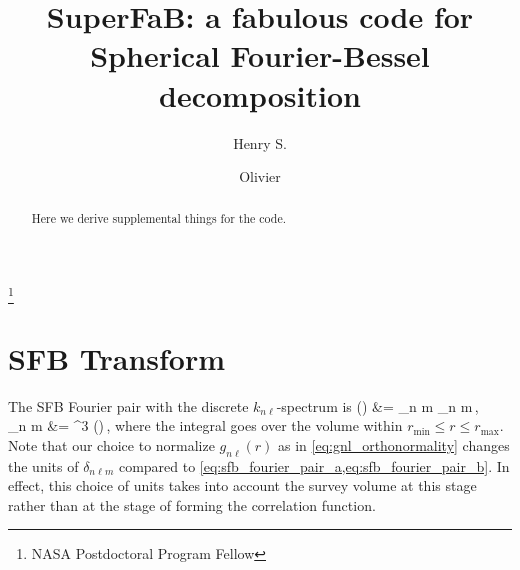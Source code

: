 \documentclass[aps,prd,reprint,floatfix,superscriptaddress,showkeys,nofootinbib]{revtex4-1}
\def\ba#1\ea{\begin{align}#1\end{align}}
\def\vr{{\bm{r}}}
\def\rhat{{\hat{\bm{r}}}}
\def\min{\mathrm{min}}
\def\max{\mathrm{max}}
\def\dd{\mathrm{d}}
\begin{document}
\title{SuperFaB: a fabulous code for Spherical Fourier-Bessel decomposition}

\author{Henry S. }
\thanks{NASA Postdoctoral Program Fellow}

\author{Olivier }




\begin{abstract}
	Here we derive supplemental things for the code.
\end{abstract}



\maketitle

\newcommand{\codename}{\emph{SuperFaB}}



\section{SFB Transform}
The SFB Fourier pair with the discrete $k_{n\ell}$-spectrum is
\ba
\delta(\vr) &= \sum_{n \ell m}
\Big[g_{n\ell}(r)\,Y_{\ell m}(\rhat)\Big]
\delta_{n \ell m}\,,
\label{eq:sfb_discrete_fourier_pair_a}
\\
\delta_{n \ell m} &=
\int\dd^3\vr
\Big[g_{n\ell}(r)\,Y^*_{\ell m}(\rhat)\Big]
\delta(\vr)\,,
\label{eq:sfb_discrete_fourier_pair_b}
\ea
where the integral goes over the volume within $r_\min\leq r\leq r_\max$. Note
that our choice to normalize $g_{n\ell}(r)$ as in \cref{eq:gnl_orthonormality}
changes the units of $\delta_{n\ell m}$ compared to
\cref{eq:sfb_fourier_pair_a,eq:sfb_fourier_pair_b}. In effect, this choice of
units takes into account the survey volume at this stage rather than at the
stage of forming the correlation function.
\end{document}
